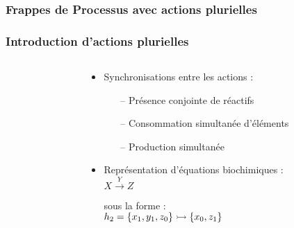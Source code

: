 
\begin{frame}[c]
  \frametitle{Frappes de Processus avec actions plurielles}


\end{frame}



\begin{frame}[c]
  \frametitle{Introduction d'actions plurielles}

\begin{columns}
\begin{column}{.4\textwidth}


\end{column}
\begin{column}{.55\textwidth}
\begin{center}

\begin{itemize}
  \item Synchronisations entre les actions :
  \begin{itemize}
    \item[--] Présence conjointe de réactifs
    \item[--] Consommation simultanée d'éléments
    \item[--] Production simultanée
  \end{itemize}
  \item Représentation d'équations biochimiques :\\
    \centering $X \xrightarrow{Y} Z$\\
    \raggedright sous la forme :\\
    \centering $h_2 = \mbox{$\{x_1, y_1, z_0\} \rightarrowtail \{x_0, z_1\}$}$\\
\end{itemize}


\end{center}
\end{column}
\end{columns}
\end{frame}
